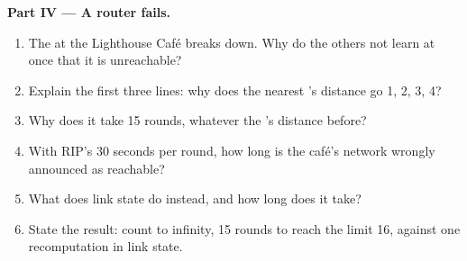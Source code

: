 \begin{problem}
\medskip\noindent\textbf{Part IV --- A router fails.}\par\nopagebreak
\begin{enumerate}[resume, beginpenalty=10000]
\item The  at the Lighthouse Café breaks down. Why do the others not learn at once that it is unreachable?
\item Explain the first three lines: why does the nearest 's distance go 1, 2, 3, 4?
\item Why does it take 15 rounds, whatever the 's distance before?
\item With RIP's 30 seconds per round, how long is the café's network wrongly announced as reachable?
\item What does link state do instead, and how long does it take?
\item State the result: count to infinity, 15 rounds to reach the limit 16, against one recomputation in link state.
\end{enumerate}
\end{problem}
